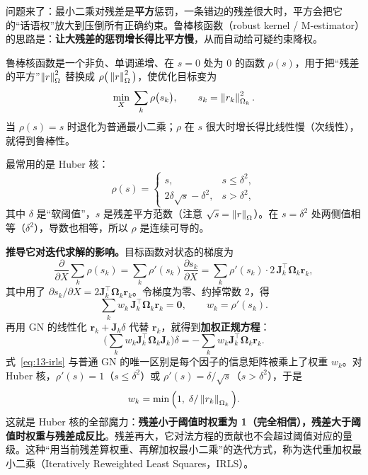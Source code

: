 问题来了：最小二乘对残差是\textbf{平方}惩罚，一条错边的残差很大时，平方会把它的``话语权''放大到压倒所有正确约束。鲁棒核函数（robust kernel / M-estimator）的思路是：\textbf{让大残差的惩罚增长得比平方慢}，从而自动给可疑约束降权。

\begin{definition}[鲁棒核函数]
鲁棒核函数是一个非负、单调递增、在 $s=0$ 处为 $0$ 的函数 $\rho(s)$，用于把``残差的平方''$\left\lVert r \right\rVert^2_{\Omega}$ 替换成 $\rho\big(\left\lVert r \right\rVert^2_{\Omega}\big)$，使优化目标变为
\begin{equation}
\min_{X}\;\sum_{k}\rho\big(s_k\big),\qquad s_k=\left\lVert r_k \right\rVert_{\Omega_k}^{2}.
\end{equation}
当 $\rho(s)=s$ 时退化为普通最小二乘；$\rho$ 在 $s$ 很大时增长得比线性慢（次线性），就得到鲁棒性。
\end{definition}

最常用的是 Huber 核：
\begin{equation}
\rho(s)=\begin{cases}
s, & s\le\delta^{2},\\[2pt]
2\delta\sqrt{s}-\delta^{2}, & s>\delta^{2},
\end{cases}
\label{eq:13-huber}
\end{equation}
其中 $\delta$ 是``软阈值''，$s$ 是残差平方范数（注意 $\sqrt{s}=\left\lVert r \right\rVert_{\Omega}$）。在 $s=\delta^2$ 处两侧值相等（$\delta^2$），导数也相等，所以 $\rho$ 是连续可导的。

\textbf{推导它对迭代求解的影响。}目标函数对状态的梯度为
\begin{equation}
\frac{\partial}{\partial X}\sum_k\rho(s_k)
=\sum_k\rho'(s_k)\frac{\partial s_k}{\partial X}
=\sum_k\rho'(s_k)\cdot 2\,\bm{J}_k^{\top}\bm{\Omega}_k\bm{r}_k,
\end{equation}
其中用了 $\partial s_k/\partial X=2\bm{J}_k^{\top}\bm{\Omega}_k\bm{r}_k$。令梯度为零、约掉常数 2，得
\begin{equation}
\sum_k w_k\,\bm{J}_k^{\top}\bm{\Omega}_k\bm{r}_k=\bm{0},
\qquad w_k=\rho'(s_k).
\end{equation}
再用 GN 的线性化 $\bm{r}_k+\bm{J}_k\delta$ 代替 $\bm{r}_k$，就得到\textbf{加权正规方程}：
\begin{equation}
\Big(\sum_k w_k\bm{J}_k^{\top}\bm{\Omega}_k\bm{J}_k\Big)\delta
=-\sum_k w_k\bm{J}_k^{\top}\bm{\Omega}_k\bm{r}_k .
\label{eq:13-irls}
\end{equation}
式~\eqref{eq:13-irls} 与普通 GN 的唯一区别是每个因子的信息矩阵被乘上了权重 $w_k$。对 Huber 核，$\rho'(s)=1$（$s\le\delta^2$）或 $\rho'(s)=\delta/\sqrt{s}$（$s>\delta^2$），于是
\begin{equation}
w_k=\min\Big(1,\;\delta/\left\lVert r_k \right\rVert_{\Omega_k}\Big).
\label{eq:13-huber-weight}
\end{equation}
这就是 Huber 核的全部魔力：\textbf{残差小于阈值时权重为 1（完全相信），残差大于阈值时权重与残差成反比}。残差再大，它对法方程的贡献也不会超过阈值对应的量级。这种``用当前残差算权重、再解加权最小二乘''的迭代方式，称为迭代重加权最小二乘（Iteratively Reweighted Least Squares，IRLS）。

